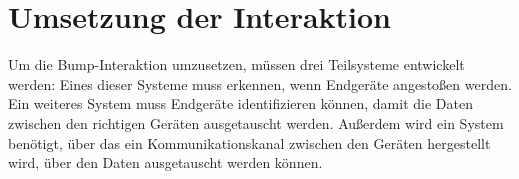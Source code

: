 \section{Umsetzung der Interaktion}
Um die Bump-Interaktion umzusetzen, müssen drei Teilsysteme entwickelt werden: Eines dieser Systeme muss erkennen, wenn Endgeräte angestoßen werden. Ein weiteres System muss Endgeräte identifizieren können, damit die Daten zwischen den richtigen Geräten ausgetauscht werden. Außerdem wird ein System benötigt, über das ein Kommunikationskanal zwischen den Geräten hergestellt wird, über den Daten ausgetauscht werden können.
